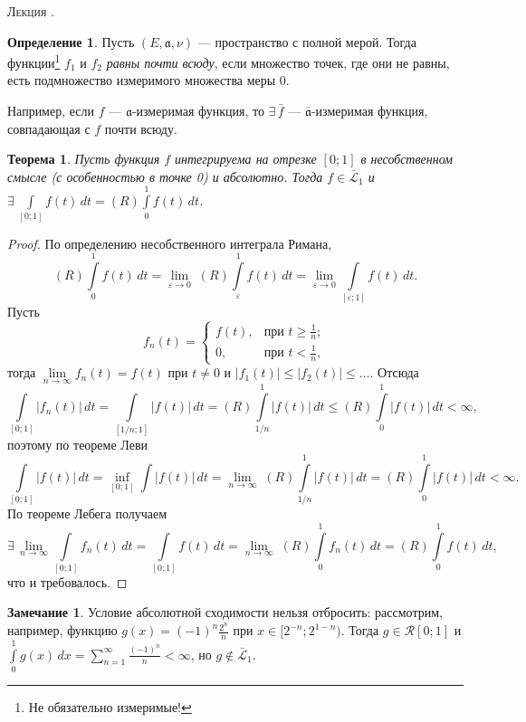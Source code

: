 \documentclass[12pt,titlepage]{article}
\newcounter{lec}
\renewcommand{\thelec}{\arabic{lec}}
\newcommand*{\lecture}{\refstepcounter{lec}\vspace{20pt}
\begin{center}{\rmfamily\textsc{Лекция \thelec.}}
\end{center}}
\newcounter{tema}
\newtheorem{theorem}{Теорема}[tema]
\theoremstyle{definition}
\newtheorem{defen}{Определение}[tema]
\newtheorem*{zam}{Замечание}
\begin{document}
\lecture

\begin{defen}
Пусть $(E, \mathfrak{a}, \nu)$ --- пространство с полной мерой.
Тогда функции\footnote{Не обязательно измеримые!} $f_1$ и $f_2$
\emph{равны почти всюду}, если множество точек, где они не равны,
есть подмножество измеримого множества меры 0.

Например, если $f$ --- $\mathfrak{a}$-измеримая функция, то
$\exists\, \bar{f}$ --- $\bar{\mathfrak{a}}$-измеримая функция,
совпадающая с $f$ почти всюду.
\end{defen}

\begin{theorem}
Пусть функция $f$ интегрируема на отрезке $[0;1]$ в несобственном
смысле (с особенностью в точке 0) и абсолютно. Тогда
$f\in\mathcal{\bar{L}}_1$ и
$\exists\,\int\limits_{[0;1]}\!f(t)\,dt=(R)\int\limits_0^1\!f(t)\,dt$.
\end{theorem}

\begin{proof}
По определению несобственного интеграла Римана,
$$(R)\int\limits_0^1\!f(t)\,dt=\lim\limits_{\varepsilon\to 0}\;(R)\int
\limits_\varepsilon^1\!f(t)\,dt
=\lim\limits_{\varepsilon\to
0}\int\limits_{[\varepsilon;1]}\!f(t)\,dt.$$ Пусть
$$f_n(t)=\begin{cases}
f(t),&\text{при $t\geqslant\frac 1 n$;}\\
0,&\text{при $t<\frac 1 n$},
\end{cases}$$ тогда $\lim\limits_{n\to\infty} f_n(t)=f(t)$ при $t\neq
0$ и $|f_1(t)|\leqslant|f_2(t)|\leqslant\ldots$. Отсюда
$$\int\limits_{[0;1]}\!|f_n(t)|\,dt=\int\limits_{[1/n;1]}\!|f(t)|\,dt=(R)\int
\limits_{1/n}^1\!|f(t)|\,dt\leqslant(R)\int\limits_0^1\!|f(t)|\,dt<\infty,$$
поэтому по теореме Леви
$$\int\limits_{[0;1]}\!|f(t)|\,dt=\inf\limits_{[0;1]}\int\!|f(t)|\,dt=\lim
\limits_{n\to\infty}\;
(R)\int\limits_{1/n}^1\!|f(t)|\,dt=(R)\int\limits_0^1\!|f(t)|\,dt<\infty.$$
По теореме Лебега получаем $$\exists\,
\lim\limits_{n\to\infty}\int\limits_{[0;1]}\!f_n(t)\,dt=\int\limits_{[0;1]}\!
f(t)\,dt=\lim\limits_{n\to\infty}\; (R)\int\limits_0^1\!f_n(t)\,dt=
(R)\int\limits_0^1\!f(t)\,dt,$$ что и требовалось.
\end{proof}

\begin{zam}
Условие абсолютной сходимости нельзя отбросить: рассмо\-трим,
например, функцию $g(x)=(-1)^n\frac{2^n}{n}$ при
$x\in[2^{-n};2^{1-n})$. Тогда $g\in\mathcal{R}[0;1]$ и
$\int\limits_0^1\!g(x)\,dx=\sum\limits_{n=1}^\infty
\frac{(-1)^n}{n}<\infty$, но $g\not\in\mathcal{\bar{L}}_1$.
\end{zam}
\end{document}
